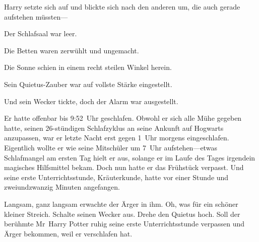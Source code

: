 Harry setzte sich auf und blickte sich nach den anderen um, die auch gerade aufstehen müssten—





Der Schlafsaal war leer.

Die Betten waren zerwühlt und ungemacht.

Die Sonne schien in einem recht steilen Winkel herein.

Sein Quietus-Zauber war auf vollste Stärke eingestellt.

Und sein Wecker tickte, doch der Alarm war ausgestellt.

Er hatte offenbar bis 9:52~Uhr geschlafen. Obwohl er sich alle Mühe gegeben hatte, seinen 26-stündigen Schlafzyklus an seine Ankunft auf Hogwarts anzupassen, war er letzte Nacht erst gegen 1~Uhr morgens eingeschlafen. Eigentlich wollte er wie seine Mitschüler um 7~Uhr aufstehen—etwas Schlafmangel am ersten Tag hielt er aus, solange er im Laufe des Tages irgendein magisches Hilfsmittel bekam. Doch nun hatte er das Frühstück verpasst. Und seine erste Unterrichtsstunde, Kräuterkunde, hatte vor einer Stunde und zweiundzwanzig Minuten angefangen.

Langsam, ganz langsam erwachte der Ärger in ihm. Oh, was für ein schöner kleiner Streich. Schalte seinen Wecker aus. Drehe den Quietus hoch. Soll der berühmte Mr~Harry Potter ruhig seine erste Unterrichtsstunde verpassen und Ärger bekommen, weil er verschlafen hat.

